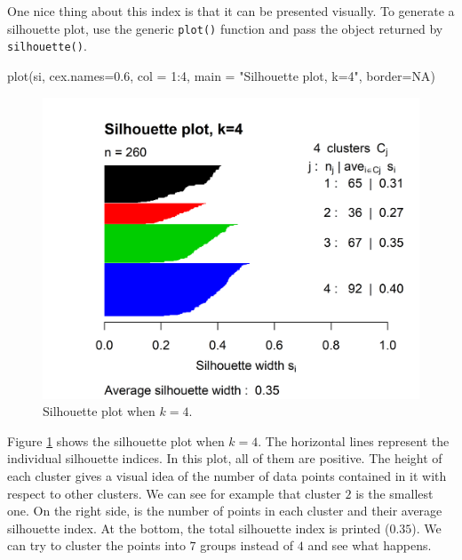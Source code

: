 \documentclass[
  11pt,
]{krantz}
\newenvironment{Shaded}{\begin{snugshade}}{\end{snugshade}}
\newcommand{\AttributeTok}[1]{\textcolor[rgb]{0.61,0.61,0.61}{#1}}
\newcommand{\ConstantTok}[1]{\textcolor[rgb]{0,0,0}{#1}}
\newcommand{\DecValTok}[1]{\textcolor[rgb]{0.06,0.06,0.06}{#1}}
\newcommand{\FloatTok}[1]{\textcolor[rgb]{0.06,0.06,0.06}{#1}}
\newcommand{\FunctionTok}[1]{\textcolor[rgb]{0,0,0}{#1}}
\newcommand{\NormalTok}[1]{#1}
\newcommand{\SpecialCharTok}[1]{\textcolor[rgb]{0,0,0}{#1}}
\newcommand{\StringTok}[1]{\textcolor[rgb]{0.5,0.5,0.5}{#1}}
\begin{document}
One nice thing about this index is that it can be presented visually. To generate a silhouette plot, use the generic \texttt{plot()} function and pass the object returned by \texttt{silhouette()}.

\begin{Shaded}
\begin{Highlighting}[]
\FunctionTok{plot}\NormalTok{(si, }\AttributeTok{cex.names=}\FloatTok{0.6}\NormalTok{, }\AttributeTok{col =} \DecValTok{1}\SpecialCharTok{:}\DecValTok{4}\NormalTok{,}
     \AttributeTok{main =} \StringTok{"Silhouette plot, k=4"}\NormalTok{,}
     \AttributeTok{border=}\ConstantTok{NA}\NormalTok{)}
\end{Highlighting}
\end{Shaded}



\begin{figure}

{\centering \includegraphics[width=0.8\linewidth]{images/si_4} 

}

\caption{Silhouette plot when \(k=4\).}\label{fig:si4}
\end{figure}

Figure \ref{fig:si4} shows the silhouette plot when \(k=4\). The horizontal lines represent the individual silhouette indices. In this plot, all of them are positive. The height of each cluster gives a visual idea of the number of data points contained in it with respect to other clusters. We can see for example that cluster \(2\) is the smallest one. On the right side, is the number of points in each cluster and their average silhouette index. At the bottom, the total silhouette index is printed (\(0.35\)). We can try to cluster the points into \(7\) groups instead of \(4\) and see what happens.
\end{document}
